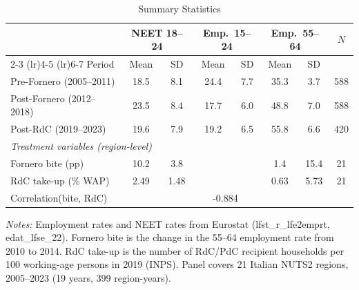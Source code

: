 \begin{table}[t]
\centering
\caption{Summary Statistics}
\label{tab:sumstats}
\begin{threeparttable}
\begin{tabular}{lccccccc}
\toprule
 & \multicolumn{2}{c}{NEET 18--24} & \multicolumn{2}{c}{Emp.~15--24} & \multicolumn{2}{c}{Emp.~55--64} & $N$ \\
\cmidrule(lr){2-3} \cmidrule(lr){4-5} \cmidrule(lr){6-7}
Period & Mean & SD & Mean & SD & Mean & SD & \\
\midrule
Pre-Fornero (2005--2011) & 18.5 & 8.1 & 24.4 & 7.7 & 35.3 & 3.7 & 588 \\
Post-Fornero (2012--2018) & 23.5 & 8.4 & 17.7 & 6.0 & 48.8 & 7.0 & 588 \\
Post-RdC (2019--2023) & 19.6 & 7.9 & 19.2 & 6.5 & 55.8 & 6.6 & 420 \\
\midrule
\multicolumn{8}{l}{\textit{Treatment variables (region-level)}} \\
Fornero bite (pp) & 10.2 & 3.8 & & & 1.4 & 15.4 & 21 \\
RdC take-up (\% WAP) & 2.49 & 1.48 & & & 0.63 & 5.73 & 21 \\
Correlation(bite, RdC) & \multicolumn{6}{c}{-0.884} \\
\bottomrule
\end{tabular}
\begin{tablenotes}[flushleft]
\small
\item \textit{Notes:} Employment rates and NEET rates from Eurostat (lfst\_r\_lfe2emprt, edat\_lfse\_22). Fornero bite is the change in the 55--64 employment rate from 2010 to 2014. RdC take-up is the number of RdC/PdC recipient households per 100 working-age persons in 2019 (INPS). Panel covers 21 Italian NUTS2 regions, 2005--2023 (19 years, 399 region-years).
\end{tablenotes}
\end{threeparttable}
\end{table}

